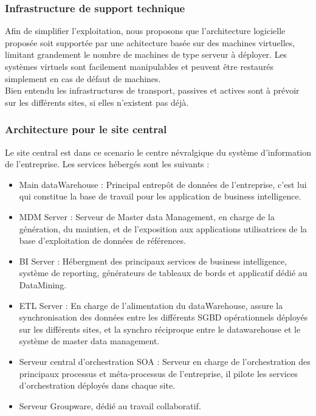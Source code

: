 \subsubsection{Infrastructure de support technique}
Afin de simplifier l'exploitation, nous proposons que l'architecture logicielle proposée soit supportée par une achitecture basée sur des machines virtuelles, limitant grandement le nombre de machines de type serveur à déployer.
Les systèmes virtuels sont facilement manipulables et peuvent être restaurés simplement en cas de défaut de machines.\\
Bien entendu les infrastructures de transport, passives et actives sont à prévoir sur les différents sites, si elles n'existent pas déjà.

\subsubsection{Architecture pour le site central}

Le site central est dans ce scenario le centre névralgique du système d'information de l'entreprise. Les services hébergés sont les suivants :\\

\begin{itemize}
\item Main dataWarehouse : Principal entrepôt de données de l'entreprise, c'est lui qui constitue la base de travail pour les application de business intelligence.
\item MDM Server :  Serveur de Master data Management, en charge de la génération, du maintien, et de l'exposition aux applications utilisatrices de la base d'exploitation de données de références.
\item BI Server : Hébergment des principaux services de business intelligence, système de reporting, générateurs de tableaux de bords et applicatif dédié au DataMining.
\item ETL Server : En charge de l'alimentation du dataWarehouse, assure la synchronisation des données entre les différents SGBD opérationnels déployés sur les différents sites, et la synchro réciproque entre le datawarehouse et le système de master data management.
\item Serveur central d'orchestration SOA : Serveur en charge de l'orchestration des principaux processus et méta-processus de l'entreprise, il pilote les services d'orchestration déployés dans chaque site.
\item Serveur Groupware, dédié au travail collaboratif.
\end{itemize}


